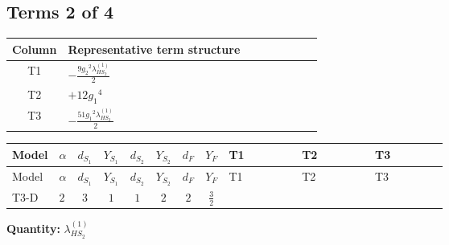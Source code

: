 \documentclass[8pt]{article}
\begin{document}
\begin{landscape}
\subsection*{Terms 2 of 4}
\begin{center}
\begin{tabular}{@{}c >{\raggedright\arraybackslash}p{0.82\linewidth}@{}}
\toprule
Column & Representative term structure \\
\midrule
T1 & \(\displaystyle -\frac{9 {g_2}^2 {\lambda_{HS_2}^{(1)}}}{2}\) \\
\midrule
T2 & \(\displaystyle +12 {g_1}^4\) \\
\midrule
T3 & \(\displaystyle -\frac{51 {g_1}^2 {\lambda_{HS_2}^{(1)}}}{2}\) \\
\midrule
\bottomrule
\end{tabular}
\end{center}
\smallskip
\tiny
\begin{longtable}{@{}llcccccc >{\raggedright\arraybackslash}p{0.21\linewidth} >{\raggedright\arraybackslash}p{0.21\linewidth} >{\raggedright\arraybackslash}p{0.21\linewidth}@{}}
\toprule
Model & $\alpha$ & $d_{S_1}$ & $Y_{S_1}$ & $d_{S_2}$ & $Y_{S_2}$ & $d_F$ & $Y_F$ & T1 & T2 & T3 \\
\midrule
\endfirsthead
\toprule
Model & $\alpha$ & $d_{S_1}$ & $Y_{S_1}$ & $d_{S_2}$ & $Y_{S_2}$ & $d_F$ & $Y_F$ & T1 & T2 & T3 \\
\midrule
\endhead
T3-D & $2$ & $3$ & $1$ & $1$ & $2$ & $2$ & $\frac{3}{2}$ & \scriptsize\adjustbox{max width=\linewidth}{$\begin{gathered} -\frac{9 {g_2}^2 {\lambda_{HS_2}^{(1)}}}{2}\end{gathered}$} & \scriptsize\adjustbox{max width=\linewidth}{$\begin{gathered} +12 {g_1}^4\end{gathered}$} & \scriptsize\adjustbox{max width=\linewidth}{$\begin{gathered} -\frac{51 {g_1}^2 {\lambda_{HS_2}^{(1)}}}{2}\end{gathered}$} \\
\midrule
\bottomrule
\end{longtable}
\clearpage
\noindent\textbf{Quantity: }$\lambda_{HS_2}^{(1)}$\par\smallskip

\end{landscape}
\end{document}
